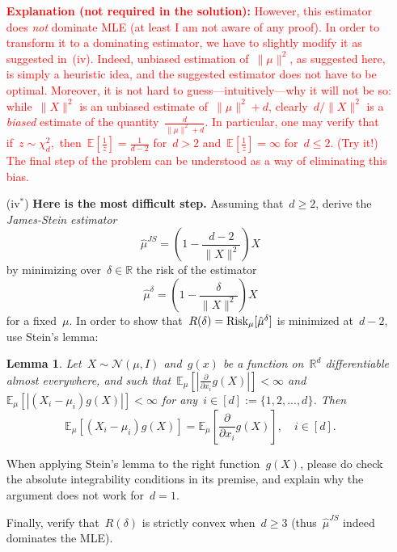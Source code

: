 \documentclass[11pt]{article}
\newtheorem{lemma}{Lemma}%
\newcommand{\R}{\mathds{R}}
\newcommand{\E}{\mathds{E}}
\newcommand{\cN}{\mathcal{N}}
\newcommand{\Risk}{\textup{Risk}}
\newcommand{\leqs}{\leqslant}
\newcommand{\geqs}{\geqslant}
\renewcommand{\le}{\leqs}
\renewcommand{\ge}{\geqs}
\begin{document}
\begin{itemize}
\textcolor{red}{
\textbf{Explanation (not required in the solution):}
However, this estimator does {\em not} dominate MLE (at least I am not aware of any proof). In order to transform it to a dominating estimator, we have to slightly modify it as suggested in~(iv). Indeed, unbiased estimation of~$\|\mu\|^2$, as suggested here, is simply a heuristic idea, and the suggested estimator does not have to be optimal. Moreover, it is not hard to guess---intuitively---why it will not be so: while~$\|X\|^2$ is an unbiased estimate of~$\|\mu\|^2 + d$, clearly~$d/\|X\|^2$ is a {\em biased} estimate of the quantity~$\frac{d}{\|\mu\|^2 + d}$. 
In particular, one may verify that if~$z \sim \chi_d^2$,~then~$\E[\frac{1}{z}] = \frac{1}{d-2}$ for~$d > 2$ and~$\E[\frac{1}{z}] = \infty$ for~$d \le 2$. (Try it!)
The final step of the problem can be understood as a way of eliminating this bias.
}

\item[(iv$^*$)]
{\bf Here is the most difficult step.} 
Assuming that~$d \ge 2$, derive the {\em James-Stein estimator}
\begin{equation}
\hat \mu^{JS} = \left(1-\frac{d-2}{\|X\|^2}\right) X
\end{equation}
by minimizing over~$\delta \in \R$ the risk of the estimator  
\[
\hat \mu^{\delta} = \left(1-\frac{\delta}{\|X\|^2}\right) X
\]
for a fixed~$\mu$. 
In order to show that~$R(\delta) = \Risk_{\mu}[\hat \mu^{\delta}]$ is minimized at~$d-2$, use Stein's lemma: 

\begin{lemma}
Let~$X \sim \cN(\mu, I)$ and~$g(x)$ be a function on~$\R^d$ differentiable almost everywhere, and such that~$\E_{\mu} \left[ | \frac{\partial}{\partial x_i} g(X) | \right] < \infty$ and~$\E_{\mu}[|(X_i - \mu_i)g(X)|] < \infty$ for any~$i \in [d] := \{1, 2, ..., d\}$. Then
\[
\E_{\mu} [(X_i - \mu_i)g(X)] = \E_{\mu} \left[ \frac{\partial}{\partial x_i} g(X) \right], \quad i \in [d].
\]
\end{lemma}

When applying Stein's lemma to the right function~$g(X)$, please do check the absolute integrability conditions in its premise, and explain why the argument does not work for~$d = 1$.

Finally, verify that~$R(\delta)$ is strictly convex when~$d \ge 3$ (thus~$\hat \mu^{JS}$ indeed dominates the MLE). 


\end{itemize}
\end{document}
